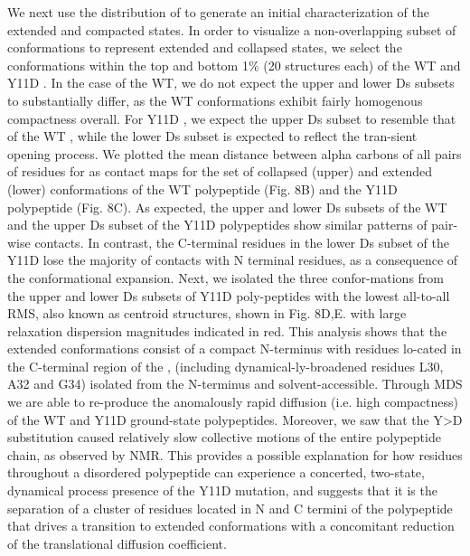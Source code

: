 We next use the distribution of \diffusion{} to generate an initial characterization of the extended and compacted states. In order to visualize a non-overlapping subset of conformations to represent extended and collapsed states, we select the conformations within the top and bottom 1\% (20 structures each) of the WT \gct{} and Y11D \gct{}. In the case of the WT, we do not expect the upper and lower Ds subsets to substantially differ, as the WT \gct{} conformations exhibit fairly homogenous compactness overall. For Y11D \gct{}, we expect the upper Ds subset to resemble that of the WT \gct{}, while the lower Ds subset is expected to reflect the tran-sient opening process. We plotted the mean distance between alpha carbons of all pairs of residues for as contact maps for the set of collapsed (upper) and extended (lower) conformations of the WT \gct{} polypeptide (Fig. 8B) and the Y11D \gct{} polypeptide (Fig. 8C).   As expected, the upper and lower Ds subsets of the WT \gct{} and the upper Ds subset of the Y11D \gct{} polypeptides show similar patterns of pair-wise contacts.  In contrast, the C-terminal residues in the lower Ds subset of the Y11D \gct{} lose the majority of contacts with N terminal residues, as a consequence of the conformational expansion. Next, we isolated the three confor-mations from the upper and lower Ds subsets of  Y11D \gct{} poly-peptides with the lowest all-to-all RMS, also known as centroid structures, shown in Fig. 8D,E. with large relaxation dispersion magnitudes indicated in red. This analysis shows that the extended conformations consist of a compact N-terminus with residues lo-cated in the C-terminal region of the \gct{}, (including dynamical-ly-broadened residues L30, A32 and G34) isolated from the N-terminus and solvent-accessible. Through MDS we are able to re-produce the anomalously rapid diffusion (i.e. high compactness) of the WT and Y11D ground-state \gct{} polypeptides. Moreover, we saw that the Y>D substitution caused relatively slow collective motions of the entire polypeptide chain, as observed by NMR. This provides a possible explanation for how residues throughout a disordered polypeptide can experience a concerted, two-state, dynamical process presence of the Y11D mutation, and suggests that it is the separation of a cluster of residues located in N and C termini of the \gct{}  polypeptide that drives a transition to extended conformations with a concomitant  reduction of the translational diffusion coefficient.


